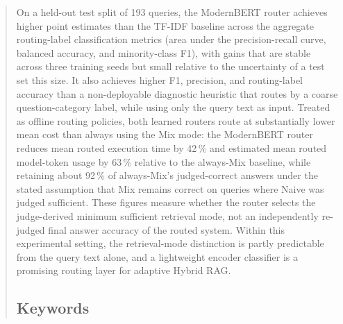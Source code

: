 \documentclass[english, bibtex]{kththesis}               %
\numberwithin{listing}{chapter}
\begin{document}
\begin{abstract}
\begin{scontents}[store-env=abstracts,print-env=true]
On a held-out test split of 193 queries, the ModernBERT router achieves higher point estimates than the TF-IDF baseline across the aggregate routing-label classification metrics (area under the precision-recall curve, balanced accuracy, and minority-class F1), with gains that are stable across three training seeds but small relative to the uncertainty of a test set this size. It also achieves higher F1, precision, and routing-label accuracy than a non-deployable diagnostic heuristic that routes by a coarse question-category label, while using only the query text as input. Treated as offline routing policies, both learned routers route at substantially lower mean cost than always using the Mix mode: the ModernBERT router reduces mean routed execution time by 42\,\% and estimated mean routed model-token usage by 63\,\% relative to the always-Mix baseline, while retaining about 92\,\% of always-Mix's judged-correct answers under the stated assumption that Mix remains correct on queries where Naive was judged sufficient. These figures measure whether the router selects the judge-derived minimum sufficient retrieval mode, not an independently re-judged final answer accuracy of the routed system. Within this experimental setting, the retrieval-mode distinction is partly predictable from the query text alone, and a lightweight encoder classifier is a promising routing layer for adaptive Hybrid RAG.
\end{scontents}

\subsection*{Keywords}
\begin{scontents}[store-env=keywords,print-env=true]
\end{scontents}
\end{abstract}
\cleardoublepage
{}
\end{document}
